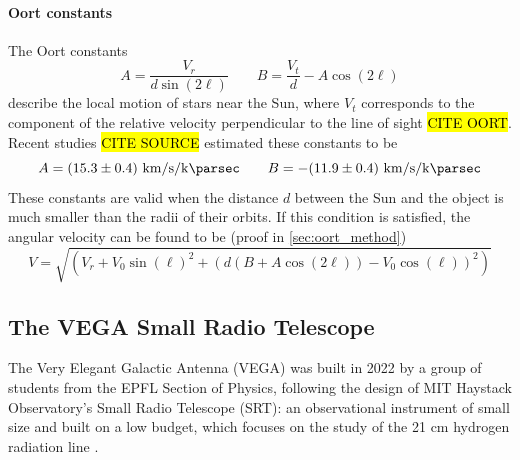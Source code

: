 \paragraph{Oort constants} The Oort constants
\begin{equation}
    A = \frac{V_r}{d \sin(2\ell)} \qquad B = \frac{V_t}{d} - A \cos(2\ell)
\end{equation}
describe the local motion of stars near the Sun, where $V_t$ corresponds to the component of the relative velocity perpendicular to the line of sight \hl{CITE OORT}. Recent studies \hl{CITE SOURCE} estimated these constants to be
\begin{equation*}
    A = (15.3 \pm 0.4) \ \si{\kilo\meter\per\second\per\kilo\parsec} \qquad B = -(11.9 \pm 0.4) \ \si{\kilo\meter\per\second\per\kilo\parsec}
\end{equation*}
These constants are valid when the distance $d$ between the Sun and the object is much smaller than the radii of their orbits. If this condition is satisfied, the angular velocity can be found to be (proof in \autoref{sec:oort_method})
\begin{equation*}
    V = \sqrt{(V_r + V_0 \sin(\ell)^2 + (d(B + A\cos(2\ell)) - V_0 \cos(\ell))^2)}
\end{equation*}

\subsection{The VEGA Small Radio Telescope}
The Very Elegant Galactic Antenna (VEGA) was built in 2022 by a group of students from the EPFL Section of Physics, following the design of MIT Haystack Observatory's Small Radio Telescope (SRT): an observational instrument of small size and built on a low budget, which focuses on the study of the 21 cm hydrogen radiation line \cite{interdisciplinary_project_2022}.

